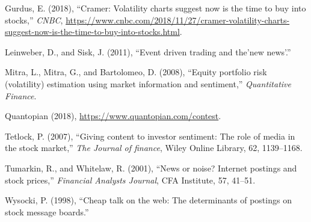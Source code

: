 \documentclass[11,]{article}
\begin{document}
\leavevmode\hypertarget{ref-cramer2018}{}%
Gurdus, E. (2018), ``Cramer: Volatility charts suggest now is the time
to buy into stocks,'' \emph{CNBC},
\url{https://www.cnbc.com/2018/11/27/cramer-volatility-charts-suggest-now-is-the-time-to-buy-into-stocks.html}.

\leavevmode\hypertarget{ref-leinweber2011}{}%
Leinweber, D., and Sisk, J. (2011), ``Event driven trading and the'new
news'.''

\leavevmode\hypertarget{ref-mitra2008}{}%
Mitra, L., Mitra, G., and Bartolomeo, D. (2008), ``Equity portfolio risk
(volatility) estimation using market information and sentiment,''
\emph{Quantitative Finance}.

\leavevmode\hypertarget{ref-q}{}%
Quantopian (2018), \url{https://www.quantopian.com/contest}.

\leavevmode\hypertarget{ref-tetlock2007}{}%
Tetlock, P. (2007), ``Giving content to investor sentiment: The role of
media in the stock market,'' \emph{The Journal of finance}, Wiley Online
Library, 62, 1139--1168.

\leavevmode\hypertarget{ref-tumarkin2001}{}%
Tumarkin, R., and Whitelaw, R. (2001), ``News or noise? Internet
postings and stock prices,'' \emph{Financial Analysts Journal}, CFA
Institute, 57, 41--51.

\leavevmode\hypertarget{ref-wysocki1998}{}%
Wysocki, P. (1998), ``Cheap talk on the web: The determinants of
postings on stock message boards.''
\end{document}
